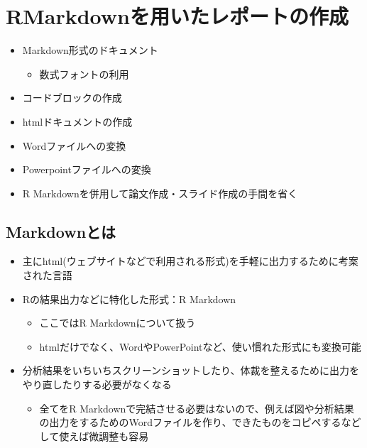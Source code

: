 \documentclass[
]{ltjsarticle}
\providecommand{\tightlist}{%
  \setlength{\itemsep}{0pt}\setlength{\parskip}{0pt}}
\begin{document}
\hypertarget{rmarkdownux3092ux7528ux3044ux305fux30ecux30ddux30fcux30c8ux306eux4f5cux6210}{%
\section{RMarkdownを用いたレポートの作成}\label{rmarkdownux3092ux7528ux3044ux305fux30ecux30ddux30fcux30c8ux306eux4f5cux6210}}

\begin{itemize}
\tightlist
\item
  Markdown形式のドキュメント

  \begin{itemize}
  \tightlist
  \item
    数式フォントの利用
  \end{itemize}
\item
  コードブロックの作成
\item
  htmlドキュメントの作成
\item
  Wordファイルへの変換
\item
  Powerpointファイルへの変換
\item
  R Markdownを併用して論文作成・スライド作成の手間を省く
\end{itemize}

\hypertarget{markdownux3068ux306f}{%
\subsection{Markdownとは}\label{markdownux3068ux306f}}

\begin{itemize}
\tightlist
\item
  主にhtml(ウェブサイトなどで利用される形式)を手軽に出力するために考案された言語
\item
  Rの結果出力などに特化した形式：R Markdown

  \begin{itemize}
  \tightlist
  \item
    ここではR Markdownについて扱う
  \item
    htmlだけでなく、WordやPowerPointなど、使い慣れた形式にも変換可能
  \end{itemize}
\item
  分析結果をいちいちスクリーンショットしたり、体裁を整えるために出力をやり直したりする必要がなくなる

  \begin{itemize}
  \tightlist
  \item
    全てをR
    Markdownで完結させる必要はないので、例えば図や分析結果の出力をするためのWordファイルを作り、できたものをコピペするなどして使えば微調整も容易
  \end{itemize}
\end{itemize}
\end{document}

